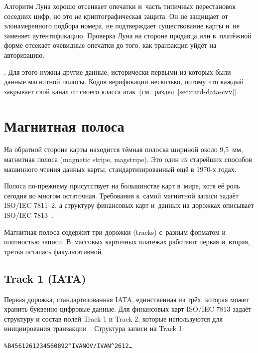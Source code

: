 
Алгоритм Луна хорошо отсеивает опечатки и~часть типичных
перестановок соседних цифр, но это \emph{не} криптографическая защита.
Он не защищает от злонамеренного подбора номера, не подтверждает
существование карты и~не заменяет аутентификацию. Проверка Луна
на стороне продавца или в~платёжной форме отсекает очевидные
опечатки до того, как транзакция уйдёт на авторизацию.

. Для этого нужны другие данные, исторически
первыми из которых были данные магнитной полосы. Кодов верификации
несколько, потому что каждый закрывает свой канал от своего класса
атак~(см.~раздел~\ref{sec:card-data-cvv}).
\section{Магнитная полоса}\label{sec:card-data-magstripe}

На обратной стороне карты находится тёмная полоска шириной
около 9,5~мм, магнитная полоса (magnetic stripe, magstripe).
Это один из старейших способов машинного чтения данных
карты, стандартизированный ещё в 1970-х годах.

Полоса по-прежнему присутствует на большинстве карт в~мире, хотя её
роль сегодня во многом остаточная. Требования к~самой магнитной
записи задаёт ISO/IEC 7811--2, а структуру финансовых карт и~данных
на дорожках описывает ISO/IEC 7813~\cite{iso-7811-2,iso-7813}.

Магнитная полоса содержит три дорожки (tracks) с~разным форматом
и плотностью записи. В~массовых карточных платежах работают
первая и~вторая, третья осталась факультативной.

\subsection*{Track 1 (IATA)}

Первая дорожка, стандартизованная IATA, единственная
из трёх, которая может хранить буквенно-цифровые данные. Для
финансовых карт ISO/IEC 7813 задаёт структуру и состав полей
Track 1 и Track 2, которые используются для инициирования
транзакции~\cite{iso-7813,visa-tadg}.
Структура записи на Track 1:

\begin{center}
  \texttt{\%B4561261234560892\^{}IVANOV/IVAN\^{}2612\ldots}
\end{center}

